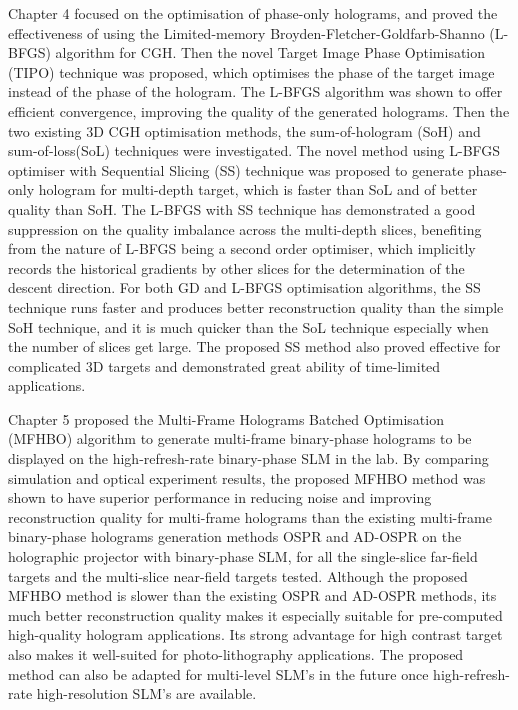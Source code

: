 Chapter 4 focused on the optimisation of phase-only holograms, and proved the effectiveness of using the Limited-memory Broyden-Fletcher-Goldfarb-Shanno (L-BFGS) algorithm for CGH. Then the novel Target Image Phase Optimisation (TIPO) technique was proposed, which optimises the phase of the target image instead of the phase of the hologram. The L-BFGS algorithm was shown to offer efficient convergence, improving the quality of the generated holograms. Then the two existing 3D CGH optimisation methods, the sum-of-hologram (SoH) and sum-of-loss(SoL) techniques were investigated. The novel method using L-BFGS optimiser with Sequential Slicing (SS) technique was proposed to generate phase-only hologram for multi-depth target, which is faster than SoL and of better quality than SoH. The L-BFGS with SS technique has demonstrated a good suppression on the quality imbalance across the multi-depth slices, benefiting from the nature of L-BFGS being a second order optimiser, which implicitly records the historical gradients by other slices for the determination of the descent direction. For both GD and L-BFGS optimisation algorithms, the SS technique runs faster and produces better reconstruction quality than the simple SoH technique, and it is much quicker than the SoL technique especially when the number of slices get large. The proposed SS method also proved effective for complicated 3D targets and demonstrated great ability of time-limited applications.

Chapter 5 proposed the Multi-Frame Holograms Batched Optimisation (MFHBO) algorithm to generate multi-frame binary-phase holograms to be displayed on the high-refresh-rate binary-phase SLM in the lab. By comparing simulation and optical experiment results, the proposed MFHBO method was shown to have superior performance in reducing noise and improving reconstruction quality for multi-frame holograms than the existing multi-frame binary-phase holograms generation methods OSPR and AD-OSPR on the holographic projector with binary-phase SLM, for all the single-slice far-field targets and the multi-slice near-field targets tested. Although the proposed MFHBO method is slower than the existing OSPR and AD-OSPR methods, its much better reconstruction quality makes it especially suitable for pre-computed high-quality hologram applications. Its strong advantage for high contrast target also makes it well-suited for photo-lithography applications. The proposed method can also be adapted for multi-level SLM's in the future once high-refresh-rate high-resolution SLM's are available.

